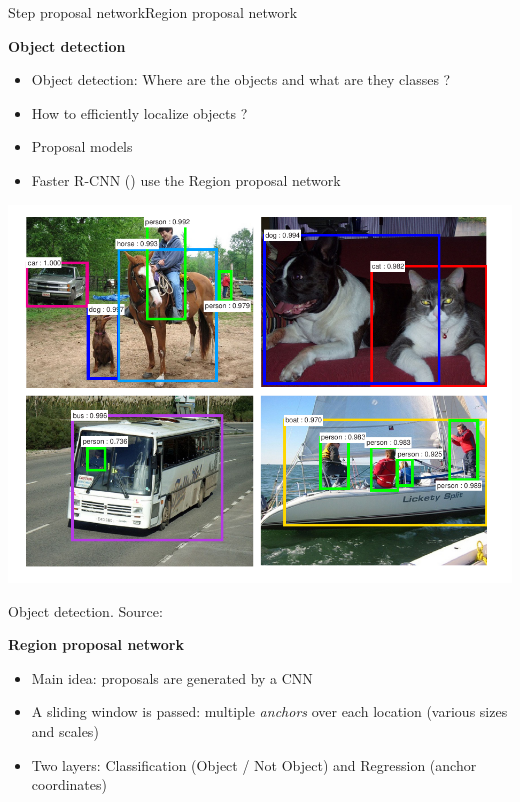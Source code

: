 \documentclass[8pt,t,aspectratio=1610]{beamer}
\begin{document}
\begin{frame}[noframenumbering]{Step proposal network}{Region proposal network}
\begin{minipage}[t]{0.45\linewidth}
\centering\textbf{Object detection}
\begin{itemize}
    \item Object detection: Where are the objects and what are they classes ?
    \item How to efficiently localize objects ?
    \item Proposal models
    \item Faster R-CNN (\citet{ren2015faster}) use the Region proposal network
\end{itemize}
    \centering
    \includegraphics[width=0.6\linewidth]{faster_rnn_rpn_imageoutputs.png}\\
    \smallskip
    \centerline{\small Object detection. Source:\citet{ren2015faster}}
\end{minipage}\hfill
\begin{minipage}[t]{0.54\linewidth}\vspace{0pt}
\centering\textbf{Region proposal network}
\begin{itemize}
    \item Main idea: proposals are generated by a CNN
    \item A sliding window is passed: multiple \emph{anchors} over each location (various sizes and scales)
    \item Two layers: Classification (Object / Not Object) and Regression (anchor coordinates)
\end{itemize}
    

\end{minipage}
\end{frame}
\end{document}

